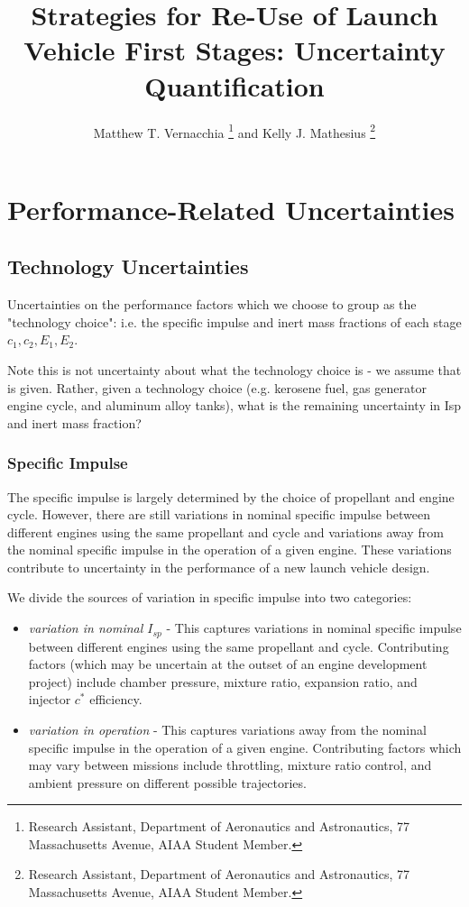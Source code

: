 \documentclass[conf]{../paper/new-aiaa}
\title{Strategies for Re-Use of Launch Vehicle First Stages: Uncertainty Quantification}
\author{Matthew T. Vernacchia \footnote{Research Assistant, Department of Aeronautics and Astronautics, 77 Massachusetts Avenue, AIAA Student Member.}
and Kelly J. Mathesius  \footnote{Research Assistant, Department of Aeronautics and Astronautics, 77 Massachusetts Avenue, AIAA Student Member.}}
\affil{Massachusetts Institute of Technology, Cambridge, MA, 02139}
\begin{document}
\maketitle

\section{Performance-Related Uncertainties}

\subsection{Technology Uncertainties}
Uncertainties on the performance factors which we choose to group as the "technology choice": i.e. the specific impulse and inert mass fractions of each stage $c_1, c_2, E_1, E_2$.

Note this is not uncertainty about what the technology choice is - we assume that is given. Rather, given a technology choice (e.g. kerosene fuel, gas generator engine cycle, and aluminum alloy tanks), what is the remaining uncertainty in Isp and inert mass fraction?

\subsubsection{Specific Impulse}
The specific impulse is largely determined by the choice of propellant and engine cycle. However, there are still variations in nominal specific impulse between different engines using the same propellant and cycle and variations away from the nominal specific impulse in the operation of a given engine. These variations contribute to uncertainty in the performance of a new launch vehicle design.

We divide the sources of variation in specific impulse into two categories:
\begin{itemize}
    \item \emph{variation in nominal $I_{sp}$} -  This captures variations in nominal specific impulse between different engines using the same propellant and cycle. Contributing factors (which may be uncertain at the outset of an engine development project) include chamber pressure, mixture ratio, expansion ratio, and injector $c^*$ efficiency.
    \item \emph{variation in operation} -  This captures variations away from the nominal specific impulse in the operation of a given engine. Contributing factors which may vary between missions include throttling, mixture ratio control, and ambient pressure on different possible trajectories.
\end{itemize}
\end{document}
